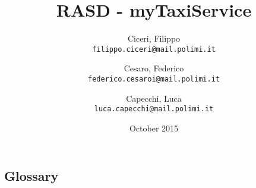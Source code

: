 \documentclass[12pt,a4paper,titlepage]{article}
\title{RASD - myTaxiService}
\author{
	Ciceri, Filippo \\
	\texttt{filippo.ciceri@mail.polimi.it}
	\and
	Cesaro, Federico \\
	\texttt{federico.cesaroi@mail.polimi.it}
	\and
	Capecchi, Luca \\
	\texttt{luca.capecchi@mail.polimi.it}
}
\date{October 2015}
\begin{document}
\maketitle
\tableofcontents
\newpage

\subsection{Glossary}



\end{document}
